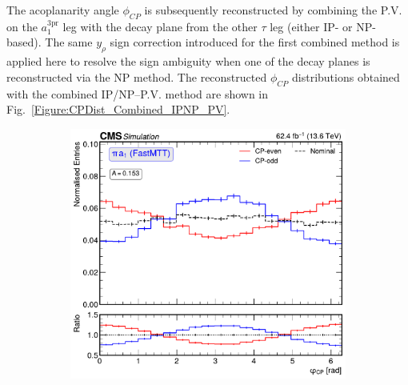 The acoplanarity angle $\phi_{CP}$ is subsequently reconstructed by combining the \ac{P.V.} on the $a_1^{3\text{pr}}$ leg with the decay plane from the other $\tau$ leg (either \ac{IP}- or \ac{NP}-based). The same $y_\rho$ sign correction introduced for the first combined method is applied here to resolve the sign ambiguity when one of the decay planes is reconstructed via the \ac{NP} method. The reconstructed $\phi_{CP}$ distributions obtained with the combined \ac{IP}/\ac{NP}--\ac{P.V.} method are shown in Fig.~\ref{Figure:CPDist_Combined_IPNP_PV}.

\begin{figure}[!htbp]
        \centering
        \begin{subfigure}[b]{0.49\textwidth}
            \centering
            \includegraphics[width=\textwidth]{Figures/Chapter7/Acoplanarity/With_IP/aco_pi_a1_FASTMTT_MassConstraint.pdf}
            \caption{}
        \end{subfigure}
        \begin{subfigure}[b]{0.49\textwidth}
            \centering

\end{subfigure}
\end{figure}
